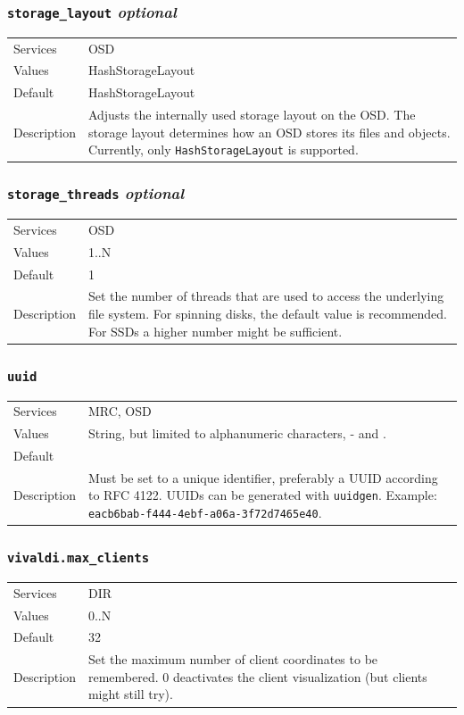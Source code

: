 \documentclass[a4paper,10pt]{book}
\begin{document}
\subsubsection{\texttt{storage\_layout} \textit{optional}}
\begin{tabular}{lp{10cm}}
 Services & OSD\\
 Values   & HashStorageLayout\\
 Default  & HashStorageLayout\\
 Description & Adjusts the internally used storage layout on the OSD. The storage layout determines how an OSD stores its files and objects. Currently, only \texttt{HashStorageLayout} is supported.
\end{tabular}

\subsubsection{\texttt{storage\_threads} \textit{optional}}
\begin{tabular}{lp{10cm}}
 Services & OSD\\
 Values   & 1..N\\
 Default  & 1\\
 Description & Set the number of threads that are used to access the underlying file system. For spinning disks, the default value is recommended. For SSDs a higher number might be sufficient.
\end{tabular}

\subsubsection{\texttt{uuid}}
\begin{tabular}{lp{10cm}}
 Services & MRC, OSD\\
 Values   & String, but limited to alphanumeric characters, - and . \\
 Default  & \\
 Description & Must be set to a unique identifier, preferably a UUID according to RFC 4122. UUIDs can be generated with \texttt{uuidgen}. Example: \texttt{eacb6bab-f444-4ebf-a06a-3f72d7465e40}.
\end{tabular}

\subsubsection{\texttt{vivaldi.max\_clients}}
\begin{tabular}{lp{10cm}}
 Services & DIR\\
 Values   & 0..N \\
 Default  & 32 \\
 Description & Set the maximum number of client coordinates to be remembered. 0 deactivates the client visualization (but clients might still try).
\end{tabular}
\end{document}
